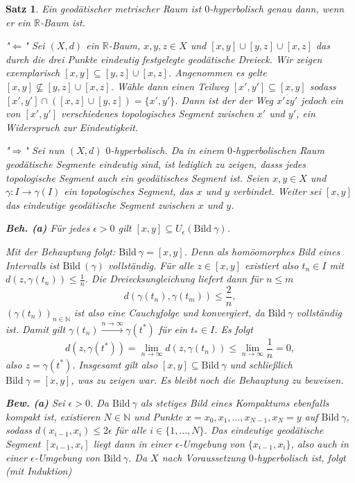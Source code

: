 \documentclass[11pt]{book}
\numberwithin{dummy}{section}
\newtheorem{theorem}{Satz}[section]
\theoremstyle{nonumberbreak}
\newenvironment{pr}[1][]{\ifthenelse{\equal{#1}{}}{\proof}{\proof[#1]}\rm}{\endproof}
\newcommand{\R}{\mathbb{R}}
\newcommand{\la}{\longrightarrow}
\begin{document}
\begin{spacing}{1.4}
\begin{theorem}   %
Ein geodätischer metrischer Raum ist $0$-hyperbolisch genau dann, wenn er ein $\R$-Baum ist.
\begin{pr}
\begin{compactenum}
\item["$\Leftarrow$"] Sei $(X,d)$ ein $\R$-Baum, $x,y,z \in X$ und $[x,y] \cup [y,z] \cup [x,z]$ das durch die drei Punkte eindeutig festgelegte geodätische Dreieck. Wir zeigen exemplarisch $[x,y] \subseteq [y,z] \cup [x,z]$. Angenommen es gelte $[x,y] \nsubseteq [y,z] \cup [x,z]$. Wähle dann einen Teilweg $[x',y'] \subseteq [x,y]$ sodass $[x',y'] \cap \left( [x,z] \cup [y,z] \right) = \{x',y'\}$. Dann ist der der Weg $\overline{x'zy'}$ jedoch ein von $[x',y']$ verschiedenes topologisches Segment zwischen $x'$ und $y'$, ein Widerspruch zur Eindeutigkeit.
\item["$\Rightarrow$"] Sei nun $(X,d)$ $0$-hyperbolisch. Da in einem $0$-hyperbolischen Raum geodätische Segmente eindeutig sind, ist lediglich zu zeigen, dasss jedes topologische Segment auch ein geodätisches Segment ist. Seien $x,y \in X$ und $\gamma: I \la \gamma(I)$ ein topologisches Segment, das $x$ und $y$ verbindet. Weiter sei $[x,y]$ das eindeutige geodätische Segment zwischen $x$ und $y$.
\begin{compactenum}
\item[\textbf{Beh. (a)}] Für jedes $\epsilon >0$ gilt $[x,y] \subseteq U_{\epsilon}( \mathrm{Bild}\ \gamma)$.
\end{compactenum}
Mit der Behauptung folgt: $\mathrm{Bild} \ \gamma = [x,y]$. Denn als homöomorphes Bild eines Intervalls ist $\mathrm{Bild}\ (\gamma)$ vollständig. Für alle $z \in [x,y]$ existiert also $t_n \in I$ mit $d(z, \gamma(t_n)) \leqslant \frac{1}{n}$. Die Dreiecksungleichung liefert dann für $n \leqslant m$
$$d(\gamma(t_n), \gamma(t_m)) \leqslant \frac{2}{n},$$
$\left( \gamma(t_n)\right)_{n \in \mathbb{N}}$ ist also eine Cauchyfolge und konvergiert, da $\mathrm{Bild} \ \gamma$ vollständig ist. Damit gilt $\gamma(t_n) \overset{ n \to \infty}{\la} \gamma(t^*)$ für ein $t_* \in I$. Es folgt
$$d(z, \gamma(t^*)) = \lim_{n \to \infty} d (z, \gamma(t_n)) \leqslant \lim_{n \to \infty} \frac{1}{n} =0,$$
also $z = \gamma(t^*)$. Insgesamt gilt also $[x,y] \subseteq \mathrm{Bild}\ \gamma$ und schließlich $\mathrm{Bild} \ \gamma = [x,y]$, was zu zeigen war. Es bleibt noch die Behauptung zu beweisen.
\begin{compactenum}
\item[\textbf{Bew. (a)}] Sei $\epsilon >0$. Da $\mathrm{Bild} \ \gamma$ als stetiges Bild eines Kompaktums ebenfalls kompakt ist, existieren $N \in \mathbb{N}$ und Punkte $x=x_0, x_1, \ldots, x_{N-1}, x_N=y$ auf $\mathrm{Bild} \ \gamma$, sodass $d(x_{i-1}, x_i) \leqslant 2 \epsilon$ für alle $i \in \{1, \ldots, N\}$. Das eindeutige geodätische Segment $[x_{i-1}, x_i]$ liegt dann in einer $\epsilon$-Umgebung von $\{x_{i-1}, x_i\}$, also auch in einer $\epsilon$-Umgebung von $\mathrm{Bild} \ \gamma$. Da $X$ nach Voraussetzung $0$-hyperbolisch ist, folgt (mit Induktion)

\end{compactenum}
\end{compactenum}
\end{pr}
\end{theorem}
\end{spacing}
\end{document}
